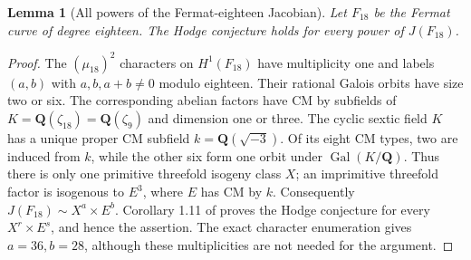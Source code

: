 \documentclass[10pt,reqno]{article}
\theoremstyle{emphasizedplain}
\newtheorem{lemma}[theorem]{Lemma}
\theoremstyle{emphasizeddefinition}
\theoremstyle{emphasizeddefinition}
\newcommand{\Q}{\mathbf Q}
\begin{document}
\begin{lemma}[All powers of the Fermat-eighteen Jacobian]\label{p:fermat18}
Let $F_{18}$ be the Fermat curve of degree eighteen. The Hodge
conjecture holds for every power of $J(F_{18})$.
\end{lemma}
\begin{proof}
The $(\mu_{18})^2$ characters on $H^1(F_{18})$ have multiplicity
one and labels $(a,b)$ with $a,b,a+b\ne0$ modulo eighteen.
Their rational Galois orbits have size two or six. The corresponding
abelian factors have CM by subfields of
$K=\Q(\zeta_{18})=\Q(\zeta_9)$ and dimension one or three.
The cyclic sextic field $K$ has a unique proper CM subfield
$k=\Q(\sqrt{-3})$. Of its eight CM types, two are induced from
$k$, while the other six form one orbit under $\operatorname{Gal}(K/\Q)$.
Thus there is only one primitive threefold isogeny class $X$;
an imprimitive threefold factor is isogenous to $E^3$, where
$E$ has CM by $k$. Consequently $J(F_{18})\sim X^a\times E^b$.
Corollary 1.11 of \cite{MilneTateStandard} proves the Hodge
conjecture for every $X^r\times E^s$, and hence the assertion.
The exact character enumeration gives $a=36,b=28$, although
these multiplicities are not needed for the argument.
\end{proof}
\end{document}
